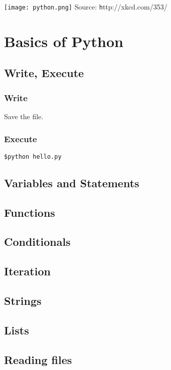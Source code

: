 \documentclass{article}
\begin{document}
\setcounter{section}{2}
\begin{center}
\texttt{[image: python.png]}
Source: {\texttt http://xkcd.com/353/}
\end{center}
\section{Basics of Python}



\subsection{Write, Execute}

\subsubsection{Write}



Save the file.

\subsubsection{Execute}

\begin{verbatim}
$python hello.py
\end{verbatim}


\subsection{Variables and Statements}

\subsection{Functions}

\subsection{Conditionals}

\subsection{Iteration}

\subsection{Strings}

\subsection{Lists}

\subsection{Reading files}
\end{document}
